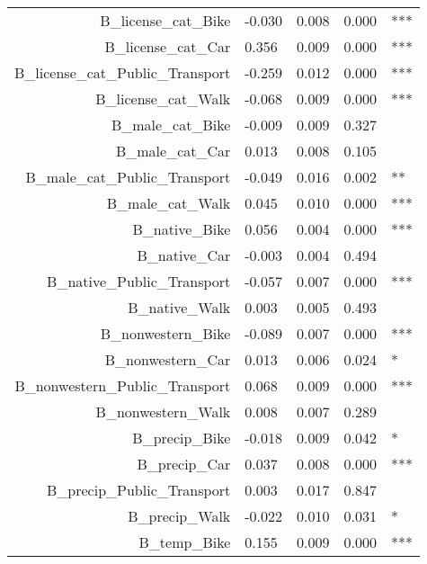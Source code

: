 \begin{table}
\begin{tabular}{rllll}
B\_license\_cat\_Bike                & -0.030 &    0.008 &    0.000 &          *** \\
B\_license\_cat\_Car                 &  0.356 &    0.009 &    0.000 &          *** \\
B\_license\_cat\_Public\_Transport   & -0.259 &    0.012 &    0.000 &          *** \\
B\_license\_cat\_Walk                & -0.068 &    0.009 &    0.000 &          *** \\
B\_male\_cat\_Bike                   & -0.009 &    0.009 &    0.327 &              \\
B\_male\_cat\_Car                    &  0.013 &    0.008 &    0.105 &              \\
B\_male\_cat\_Public\_Transport      & -0.049 &    0.016 &    0.002 &           ** \\
B\_male\_cat\_Walk                   &  0.045 &    0.010 &    0.000 &          *** \\
B\_native\_Bike                      &  0.056 &    0.004 &    0.000 &          *** \\
B\_native\_Car                       & -0.003 &    0.004 &    0.494 &              \\
B\_native\_Public\_Transport         & -0.057 &    0.007 &    0.000 &          *** \\
B\_native\_Walk                      &  0.003 &    0.005 &    0.493 &              \\
B\_nonwestern\_Bike                  & -0.089 &    0.007 &    0.000 &          *** \\
B\_nonwestern\_Car                   &  0.013 &    0.006 &    0.024 &            * \\
B\_nonwestern\_Public\_Transport     &  0.068 &    0.009 &    0.000 &          *** \\
B\_nonwestern\_Walk                  &  0.008 &    0.007 &    0.289 &              \\
B\_precip\_Bike                      & -0.018 &    0.009 &    0.042 &            * \\
B\_precip\_Car                       &  0.037 &    0.008 &    0.000 &          *** \\
B\_precip\_Public\_Transport         &  0.003 &    0.017 &    0.847 &              \\
B\_precip\_Walk                      & -0.022 &    0.010 &    0.031 &            * \\
B\_temp\_Bike                        &  0.155 &    0.009 &    0.000 &          *** \\

\end{tabular}
\end{table}
